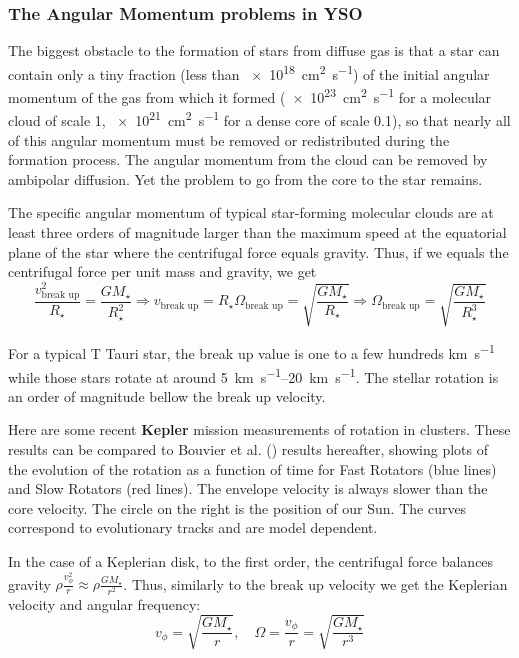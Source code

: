\documentclass[10pt,a4paper,english]{article}
\begin{document}
\subsubsection{The Angular Momentum problems in YSO}

The biggest obstacle to the formation of stars from diffuse gas is that a star
can contain only a tiny fraction (less than \SI{e18}{\square\cm\per\s}) of the
initial angular momentum of the gas from which it formed
(\SI{e23}{\square\cm\per\s} for a molecular cloud of scale \SI{1}{\pc},
\SI{e21}{\square\cm\per\s} for a dense core of scale \SI{0.1}{\pc}), so that
nearly all of this angular momentum must be removed or redistributed during the
formation process. The angular momentum from the cloud can be removed by
ambipolar diffusion. Yet the problem to go from the core to the star remains.

The specific angular momentum of typical star-forming molecular clouds are at
least three orders of magnitude larger than the maximum speed at the equatorial
plane of the star where the centrifugal force equals gravity. Thus, if we
equals the centrifugal force per unit mass and gravity, we get
\begin{equation}
    \frac{v^2_\textrm{break up}}{R_\star} = \frac{GM_\star}{R_\star^2}
    \Rightarrow v_\textrm{break up} = R_\star \Omega_\textrm{break up} = \sqrt{\frac{GM_\star}{R_\star}}
    \Rightarrow \Omega_\textrm{break up} = \sqrt{\frac{GM_\star}{R_\star^3}}
\end{equation}

For a typical T Tauri star, the break up value is one to a few hundreds
\si{\km\per\s} while those stars rotate at around \SIrange{5}{20}{\km\per\s}.
The stellar rotation is an order of magnitude bellow the break up velocity.

Here are some recent \textbf{Kepler} mission measurements of rotation in
clusters.   These results can be compared to Bouvier et
al. () results hereafter, showing plots of the
evolution of the rotation as a function of time for Fast Rotators (blue lines)
and Slow Rotators (red lines). The envelope velocity is always slower than the
core velocity. The circle on the right is the position of our Sun. The curves
correspond to evolutionary tracks and are model dependent.


In the case of a Keplerian disk, to the first order, the centrifugal force
balances gravity $\rho \frac{v_\phi^2}{r} \approx \rho \frac{GM_\star}{r^2}$.
Thus, similarly to the break up velocity we get the Keplerian velocity and
angular frequency:
\begin{equation}
    v_\phi = \sqrt{\frac{GM_\star}{r}}, \quad \Omega = \frac{v_\phi}{r} = \sqrt{\frac{GM_\star}{r^3}}
\end{equation}
\end{document}
